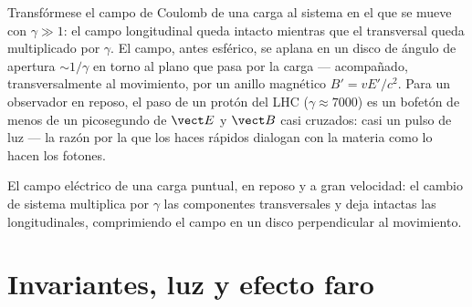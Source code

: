 \begin{example}\label{ex:b3:covariant-electromagnetism:pancake}
Transfórmese el campo de Coulomb de una carga al sistema en el que se mueve
con $\gamma \gg 1$: el campo longitudinal queda intacto mientras que el
transversal queda multiplicado por $\gamma$. El campo, antes esférico, se
aplana en un disco de ángulo de apertura $\sim 1/\gamma$ en torno al plano
que pasa por la carga --- acompañado, transversalmente al movimiento, por un
anillo magnético $B' = vE'/c^2$. Para un observador en reposo, el paso de un
protón del LHC ($\gamma \approx 7000$) es un bofetón de
menos de un picosegundo de $\vect E$ y $\vect B$ casi cruzados: casi un
pulso de luz --- la razón por la que los haces rápidos dialogan con la
materia como lo hacen los fotones.
\end{example}

\begin{omfigure}

{\small El campo eléctrico de una carga puntual, en reposo y a gran
velocidad: el cambio de sistema multiplica por $\gamma$ las componentes
transversales y deja intactas las longitudinales, comprimiendo el campo en
un disco perpendicular al movimiento.}
\end{omfigure}

\section{Invariantes, luz y efecto faro}

